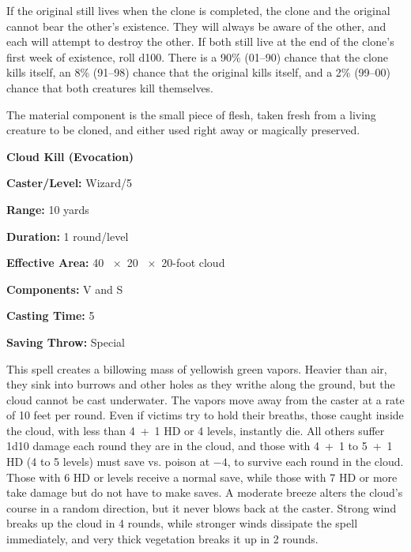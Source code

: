 \begin{multicols}{2}
If the original still lives when the clone is completed, the clone and the original cannot bear the other's existence.  They will always be aware of the other, and each will attempt to destroy the other.  If both still live at the end of the clone's first week of existence, roll d100.  There is a 90\% (01--90) chance that the clone kills itself, an 8\% (91--98) chance that the original kills itself, and a 2\% (99--00) chance that both creatures kill themselves.
 
The material component is the small piece of flesh, taken fresh from a living creature to be cloned, and either used right away or magically preserved.

\vspace{1em}

\noindent
\begin{minipage}{\columnwidth}

\noindent \textbf{Cloud Kill (Evocation)}

\noindent \textbf{Caster/Level:} Wizard/5

\noindent \textbf{Range:} 10 yards

\noindent \textbf{Duration:} 1 round/level

\noindent \textbf{Effective Area:} 40 ~$\times$~20 ~$\times$~20-foot cloud

\noindent \textbf{Components:} V and S

\noindent \textbf{Casting Time:} 5

\noindent \textbf{Saving Throw:} Special

\end{minipage}

This spell creates a billowing mass of yellowish green vapors.  Heavier than air, they sink into burrows and other holes as they writhe along the ground, but the cloud cannot be cast underwater.  The vapors move away from the caster at a rate of 10 feet per round.  Even if victims try to hold their breaths, those caught inside the cloud, with less than 4~+~1 HD or 4 levels, instantly die.  All others suffer 1d10 damage each round they are in the cloud, and those with 4~+~1 to 5~+~1 HD (4 to 5 levels) must save vs. poison at $-4$, to survive each round in the cloud.  Those with 6 HD or levels receive a normal save, while those with 7 HD or more take damage but do not have to make saves.  A moderate breeze alters the cloud's course in a random direction, but it never blows back at the caster.  Strong wind breaks up the cloud in 4 rounds, while stronger winds dissipate the spell immediately, and very thick vegetation breaks it up in 2 rounds. 


\end{multicols}
